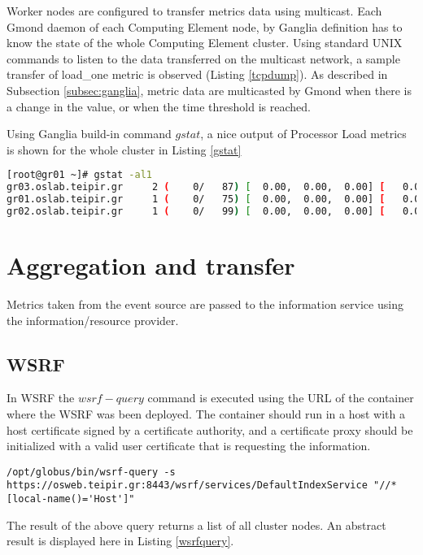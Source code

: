 Worker nodes are configured to transfer metrics data using multicast. Each Gmond daemon of each Computing Element node, by Ganglia definition has to know the state of the whole Computing Element cluster. Using standard UNIX commands to listen to the data transferred on the multicast network, a sample transfer of load\_one metric is observed (Listing \ref{tcpdump}). As described in Subsection \ref{subsec:ganglia}, metric data are multicasted by Gmond when there is a change in the value, or when the time threshold is reached.

Using Ganglia build-in command $gstat$, a nice output of Processor Load metrics is shown for the whole cluster in Listing \ref{gstat}

\begin{lstlisting}[language=bash,caption=Gstat output,label=gstat]
[root@gr01 ~]# gstat -al1
gr03.oslab.teipir.gr     2 (    0/   87) [  0.00,  0.00,  0.00] [   0.0,   0.0,   0.0,  99.9,   0.1] OFF
gr01.oslab.teipir.gr     1 (    0/   75) [  0.00,  0.00,  0.00] [   0.0,   0.0,   0.0,  99.9,   0.0] OFF
gr02.oslab.teipir.gr     1 (    0/   99) [  0.00,  0.00,  0.00] [   0.0,   0.0,   0.1,  99.9,   0.0] OFF
\end{lstlisting}

\section{Aggregation and transfer}

Metrics taken from the event source are passed to the information service using the information/resource provider.

\subsection{WSRF}

In WSRF the $wsrf-query$ command is executed using the URL of the container where the WSRF was been deployed. The container should run in a host with a host certificate signed by a certificate authority, and a certificate proxy should be initialized with a valid user certificate that is requesting the information. 

\begin{lstlisting}
/opt/globus/bin/wsrf-query -s https://osweb.teipir.gr:8443/wsrf/services/DefaultIndexService "//*[local-name()='Host']"
\end{lstlisting}

The result of the above query returns a list of all cluster nodes. An abstract result is displayed here in Listing \ref{wsrfquery}.

